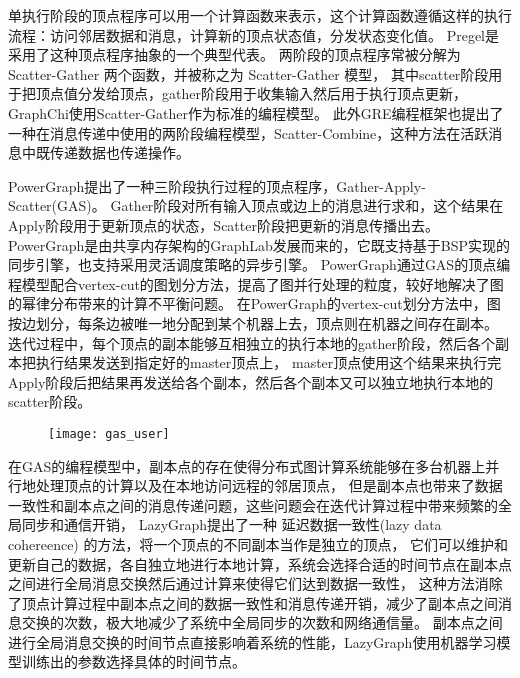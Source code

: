 单执行阶段的顶点程序可以用一个计算函数来表示，这个计算函数遵循这样的执行流程：访问邻居数据和消息，计算新的顶点状态值，分发状态变化值。
Pregel是采用了这种顶点程序抽象的一个典型代表。
两阶段的顶点程序常被分解为 Scatter-Gather 两个函数，并被称之为 Scatter-Gather 模型，
其中scatter阶段用于把顶点值分发给顶点，gather阶段用于收集输入然后用于执行顶点更新，
GraphChi\cite{GraphChi}使用Scatter-Gather作为标准的编程模型。
此外GRE\cite{GRE}编程框架也提出了一种在消息传递中使用的两阶段编程模型，Scatter-Combine，这种方法在活跃消息中既传递数据也传递操作。

PowerGraph\cite{Gonzalez@OSDI12}提出了一种三阶段执行过程的顶点程序，Gather-Apply-Scatter(GAS)。
Gather阶段对所有输入顶点或边上的消息进行求和，这个结果在Apply阶段用于更新顶点的状态，Scatter阶段把更新的消息传播出去。
PowerGraph是由共享内存架构的GraphLab\cite{Low@12}发展而来的，它既支持基于BSP实现的同步引擎，也支持采用灵活调度策略的异步引擎。
PowerGraph通过GAS的顶点编程模型配合vertex-cut的图划分方法，提高了图并行处理的粒度，较好地解决了图的幂律分布带来的计算不平衡问题。
在PowerGraph的vertex-cut划分方法中，图按边划分，每条边被唯一地分配到某个机器上去，顶点则在机器之间存在副本。
迭代过程中，每个顶点的副本能够互相独立的执行本地的gather阶段，然后各个副本把执行结果发送到指定好的master顶点上，
master顶点使用这个结果来执行完Apply阶段后把结果再发送给各个副本，然后各个副本又可以独立地执行本地的scatter阶段。


\begin{figure}[!htbp]
\centering
\texttt{[image: gas\_user]}
\end{figure}

在GAS的编程模型中，副本点的存在使得分布式图计算系统能够在多台机器上并行地处理顶点的计算以及在本地访问远程的邻居顶点，
但是副本点也带来了数据一致性和副本点之间的消息传递问题，这些问题会在迭代计算过程中带来频繁的全局同步和通信开销，
LazyGraph\cite{Wang@PPoPP18}提出了一种 延迟数据一致性(lazy data cohereence) 的方法，将一个顶点的不同副本当作是独立的顶点，
它们可以维护和更新自己的数据，各自独立地进行本地计算，系统会选择合适的时间节点在副本点之间进行全局消息交换然后通过计算来使得它们达到数据一致性，
这种方法消除了顶点计算过程中副本点之间的数据一致性和消息传递开销，减少了副本点之间消息交换的次数，极大地减少了系统中全局同步的次数和网络通信量。
副本点之间进行全局消息交换的时间节点直接影响着系统的性能，LazyGraph使用机器学习模型训练出的参数选择具体的时间节点。


